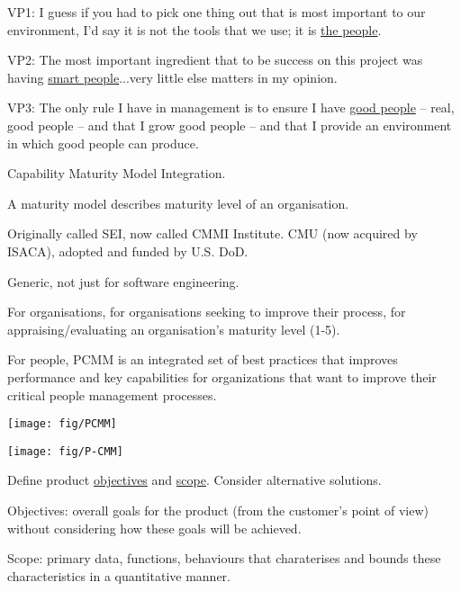 \documentclass[landscape,30pt]{foils}
\begin{document}
\newpage
VP1: I guess if you had to pick one thing out that is most important to our environment, I'd say it is not the tools that we use; it is \underline{the people}.

VP2: The most important ingredient that to be success on this project was having \underline{smart people}...very little else matters in my opinion.

VP3: The only rule I have in management is to ensure I have \underline{good people} -- real, good people -- and that I grow good people -- and that I provide an environment in which good people can produce.


Capability Maturity Model Integration.

A maturity model describes maturity level of an organisation.

Originally called SEI, now called CMMI Institute. CMU (now acquired by ISACA), adopted and funded by U.S. DoD.

Generic, not just for software engineering.

For organisations, for organisations seeking to improve their process,  for appraising/evaluating an organisation's maturity level (1-5).

For people, PCMM is an integrated set of best practices that improves performance and key capabilities for organizations that want to improve their critical people management processes.

\begin{center}
\texttt{[image: fig/PCMM]}
\end{center}

\begin{center}
\texttt{[image: fig/P-CMM]}
\end{center}


Define product \underline{objectives} and \underline{scope}.  Consider alternative solutions.

Objectives: overall goals for the product (from the customer's point of view) without considering how these goals will be achieved.

Scope: primary data, functions, behaviours that charaterises and bounds these characteristics in a quantitative manner.
\end{document}
